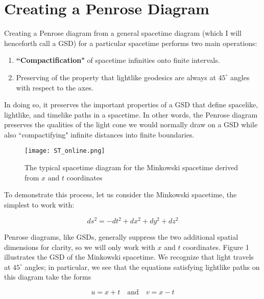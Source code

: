 \documentclass{article}
\begin{document}
\section{Creating a Penrose Diagram}

Creating a Penrose diagram from a general spacetime diagram (which I will henceforth call a GSD) for a particular spacetime performs two main operations:

\begin{enumerate}
    \item \textbf{``Compactification"} of spacetime infinities onto finite intervals.
    \item Preserving of the property that lightlike geodesics are always at $45^{\circ}$ angles with respect to the axes.
\end{enumerate}

In doing so, it preserves the important properties of a GSD that define spacelike, lightlike, and timelike paths in a spacetime. In other words, the Penrose diagram preserves the qualities of the light cone we would normally draw on a GSD while also ``compactifying" infinite distances into finite boundaries.

\begin{wrapfigure}{l}{0.5\textwidth}
\vspace{-10pt}
\texttt{[image: ST\_online.png]} 
\caption{The typical spacetime diagram for the Minkowski spacetime derived from $x$ and $t$ coordinates \cite{tikz_penrose}}
\label{fig:minsk_tikz}
\vspace{20pt}
\end{wrapfigure}

To demonstrate this process, let us consider the Minkowski spacetime, the simplest to work with:

\begin{equation}
    ds^{2} = -dt^{2} + dx^{2} + dy^{2} + dz^{2}
\end{equation}

Penrose diagrams, like GSDs, generally suppress the two additional spatial dimensions for clarity, so we will only work with $x$ and $t$ coordinates. Figure 1 illustrates the GSD of the Minkowski spacetime. We recognize that light travels at $45^{\circ}$ angles; in particular, we see that the equations satisfying lightlike paths on this diagram take the forms

\begin{equation}
    u = x + t
    \quad \text{and}\quad
    v = x - t
\end{equation}
\end{document}
